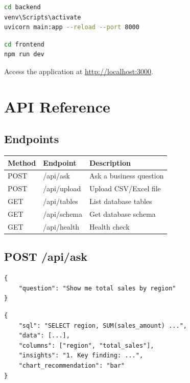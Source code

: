 \documentclass[12pt,a4paper]{article}
\begin{document}
\begin{lstlisting}[language=bash, caption=Start Backend (Terminal 1)]
cd backend
venv\Scripts\activate
uvicorn main:app --reload --port 8000
\end{lstlisting}

\begin{lstlisting}[language=bash, caption=Start Frontend (Terminal 2)]
cd frontend
npm run dev
\end{lstlisting}

Access the application at \url{http://localhost:3000}.

\section{API Reference}

\subsection{Endpoints}

\begin{tabular}{lll}
\toprule
\textbf{Method} & \textbf{Endpoint} & \textbf{Description} \\
\midrule
POST & /api/ask & Ask a business question \\
POST & /api/upload & Upload CSV/Excel file \\
GET & /api/tables & List database tables \\
GET & /api/schema & Get database schema \\
GET & /api/health & Health check \\
\bottomrule
\end{tabular}

\subsection{POST /api/ask}

\begin{lstlisting}[caption=Request]
{
    "question": "Show me total sales by region"
}
\end{lstlisting}

\begin{lstlisting}[caption=Response]
{
    "sql": "SELECT region, SUM(sales_amount) ...",
    "data": [...],
    "columns": ["region", "total_sales"],
    "insights": "1. Key finding: ...",
    "chart_recommendation": "bar"
}
\end{lstlisting}
\end{document}
